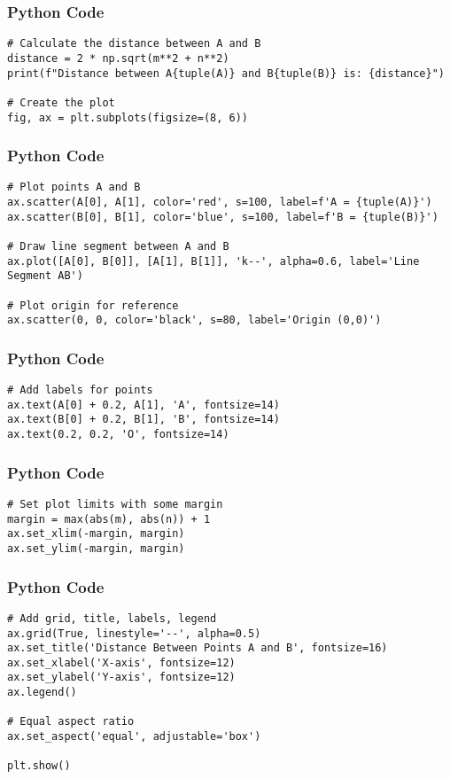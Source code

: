 \documentclass{beamer}
\begin{document}
\begin{frame}[fragile]
    \frametitle{Python Code}

    \begin{lstlisting}
# Calculate the distance between A and B
distance = 2 * np.sqrt(m**2 + n**2)
print(f"Distance between A{tuple(A)} and B{tuple(B)} is: {distance}")

# Create the plot
fig, ax = plt.subplots(figsize=(8, 6))

    \end{lstlisting}
\end{frame}

\begin{frame}[fragile]
    \frametitle{Python Code}

    \begin{lstlisting}
# Plot points A and B
ax.scatter(A[0], A[1], color='red', s=100, label=f'A = {tuple(A)}')
ax.scatter(B[0], B[1], color='blue', s=100, label=f'B = {tuple(B)}')

# Draw line segment between A and B
ax.plot([A[0], B[0]], [A[1], B[1]], 'k--', alpha=0.6, label='Line Segment AB')

# Plot origin for reference
ax.scatter(0, 0, color='black', s=80, label='Origin (0,0)')
    \end{lstlisting}
\end{frame}

\begin{frame}[fragile]
    \frametitle{Python Code}

    \begin{lstlisting}
# Add labels for points
ax.text(A[0] + 0.2, A[1], 'A', fontsize=14)
ax.text(B[0] + 0.2, B[1], 'B', fontsize=14)
ax.text(0.2, 0.2, 'O', fontsize=14)
\end{lstlisting}
\end{frame}

 
\begin{frame}[fragile]
    \frametitle{Python Code}

    \begin{lstlisting}
# Set plot limits with some margin
margin = max(abs(m), abs(n)) + 1
ax.set_xlim(-margin, margin)
ax.set_ylim(-margin, margin)
\end{lstlisting}
\end{frame}
\begin{frame}[fragile]
    \frametitle{Python Code}

    \begin{lstlisting}
# Add grid, title, labels, legend
ax.grid(True, linestyle='--', alpha=0.5)
ax.set_title('Distance Between Points A and B', fontsize=16)
ax.set_xlabel('X-axis', fontsize=12)
ax.set_ylabel('Y-axis', fontsize=12)
ax.legend()

# Equal aspect ratio
ax.set_aspect('equal', adjustable='box')

plt.show()
\end{lstlisting}
\end{frame}
\end{document}

